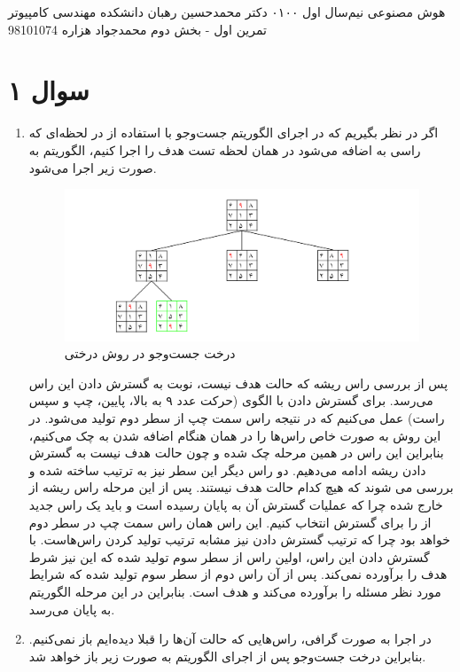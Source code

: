 \documentclass[a4paper, 11pt]{article}
\begin{document}
\handout
{هوش مصنوعی}
{نیم‌سال اول ۰۱\lr{-}۰۰}
{دکتر محمدحسین رهبان}
{دانشکده مهندسی کامپیوتر}
{تمرین اول - بخش دوم}
{محمدجواد هزاره}
{98101074}
\noindent
\\ [-5em]
\section*{سوال ۱}
\begin{enumerate}[آ)]
	\item
	اگر در نظر بگیریم که در اجرای الگوریتم جست‌و‌جو با استفاده از 
	در لحظه‌ای که راسی به 
	اضافه می‌شود در همان لحظه تست هدف را اجرا کنیم، الگوریتم به صورت زیر اجرا می‌شود.	
	\begin{figure}[H]
		\centering
		\includegraphics[width=\textwidth]{pics/tree-search.png}
		\caption{درخت جست‌و‌جو در روش درختی}
	\end{figure}
	پس از بررسی راس ریشه که حالت هدف نیست، نوبت به گسترش دادن این راس می‌رسد. برای گسترش دادن با الگوی (حرکت عدد ۹ به بالا، پایین، چپ و سپس راست) عمل می‌کنیم که در نتیجه راس سمت چپ از سطر دوم تولید می‌شود. در این روش به صورت خاص راس‌ها را در همان هنگام اضافه شدن به  چک می‌کنیم، بنابراین این راس در همین مرحله چک شده و چون حالت هدف نیست به گسترش دادن ریشه ادامه می‌دهیم. دو راس دیگر این سطر نیز به ترتیب ساخته شده و بررسی می شوند که هیچ کدام حالت هدف نیستند. پس از این مرحله راس ریشه از  خارج شده چرا که عملیات گسترش آن به پایان رسیده است و باید یک راس جدید از  را برای گسترش انتخاب کنیم. این راس همان راس سمت چپ در سطر دوم خواهد بود چرا که ترتیب گسترش دادن نیز مشابه ترتیب تولید کردن راس‌هاست. با گسترش دادن این راس، اولین راس از سطر سوم تولید شده که این نیز شرط هدف را برآورده نمی‌کند. پس از آن راس دوم از سطر سوم تولید شده که شرایط مورد نظر مسئله را برآورده می‌کند و هدف است. بنابراین در این مرحله الگوریتم به پایان می‌رسد.
	\item
	در اجرا به صورت گرافی، راس‌هایی که حالت‌ آن‌ها را قبلا دیده‌ایم باز نمی‌کنیم. بنابراین درخت جست‌وجو پس از اجرای الگوریتم به صورت زیر باز خواهد شد.

\end{enumerate}
\end{document}
